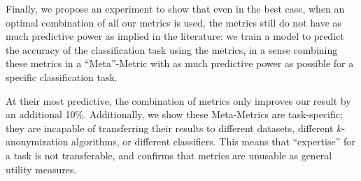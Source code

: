 Finally, we propose an experiment to show that even in the best case, when an optimal combination of all our metrics is used, the metrics still do not have as much predictive power as implied in the literature:  we train a model to predict the accuracy of the classification task using the metrics, in a sense combining these metrics in a ``Meta''-Metric with as much predictive power as possible for a specific classification task. 

At their most predictive, the combination of metrics only improves our result by an additional 10\%. Additionally, we show these Meta-Metrics are task-specific; they are incapable of transferring their results to different datasets, different $k$-anonymization algorithms, or different classifiers. This means that ``expertise'' for a task is not transferable, and confirms that metrics are unusable as general utility measures.
